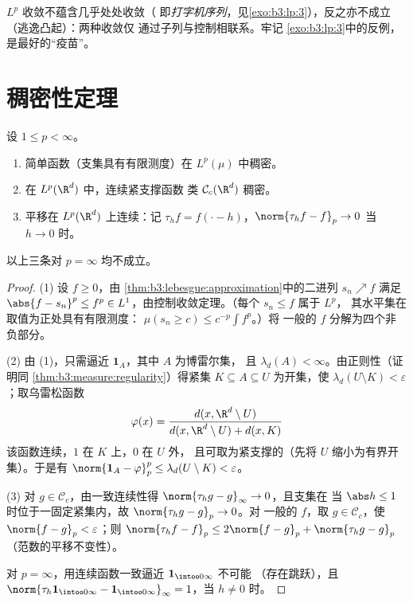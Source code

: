 \begin{remark}\label{rem:b3:lp:modes}
$L^p$ 收敛不蕴含几乎处处收敛（
即\emph{打字机序列}，见\cref{exo:b3:lp:3}），反之亦不成立
（逃逸凸起）：两种收敛仅
通过子列与控制相联系。牢记
\cref{exo:b3:lp:3}中的反例，是最好的“疫苗”。
\end{remark}

\section{稠密性定理}

\begin{theorem}\label{thm:b3:lp:density}
设 $1 \leq p < \infty$。
\begin{enumerate}
  \item 简单函数（支集具有有限测度）在
        $L^p(\mu)$ 中稠密。
  \item 在 $L^p(\R^d)$ 中，连续紧支撑函数
        类 $\mathcal C_c(\R^d)$ 稠密。
  \item 平移在 $L^p(\R^d)$ 上连续：记
        $\tau_hf = f(\cdot - h)$，$\norm{\tau_hf - f}_p \to 0$
        当 $h \to 0$ 时。
\end{enumerate}
以上三条对 $p = \infty$ 均不成立。
\end{theorem}

\begin{proof}
(1) 设 $f \geq 0$，由
\cref{thm:b3:lebesgue:approximation}中的二进列 $s_n \nearrow f$ 满足 $\abs{f - s_n}^p
\leq f^p \in L^1$，由控制收敛定理。（每个 $s_n \leq f$ 属于 $L^p$，
其水平集在取值为正处具有有限测度：
$\mu(s_n \geq c) \leq c^{-p}\int f^p$。）将
一般的 $f$ 分解为四个非负部分。

(2) 由 (1)，只需逼近 $\mathbf 1_A$，其中 $A$ 为博雷尔集，
且 $\lambda_d(A) < \infty$。由正则性（证明同
\cref{thm:b3:measure:regularity}）得紧集 $K \subseteq A
\subseteq U$ 为开集，使 $\lambda_d(U\setminus K) <
\varepsilon$；取乌雷松函数
\[
\varphi(x) = \frac{d(x, \R^d\setminus U)}{d(x, \R^d\setminus U)
+ d(x, K)}
\]
该函数连续，$1$ 在 $K$ 上，$0$ 在 $U$ 外，
且可取为紧支撑的（先将 $U$ 缩小为有界开集）。于是有
$\norm{\mathbf 1_A - \varphi}_p^p \leq \lambda_d(U\setminus K)
< \varepsilon$。

(3) 对 $g \in \mathcal C_c$，由一致连续性得
$\norm{\tau_hg - g}_\infty \to 0$，且支集在
当 $\abs h \leq 1$ 时位于一固定紧集内，故 $\norm{\tau_hg - g}_p \to 0$。对
一般的 $f$，取 $g \in \mathcal C_c$，使 $\norm{f - g}_p <
\varepsilon$；则 $\norm{\tau_hf - f}_p \leq 2\norm{f - g}_p +
\norm{\tau_hg - g}_p$（范数的平移不变性）。

对 $p = \infty$，用连续函数一致逼近 $\mathbf
1_{\intoo0\infty}$ 不可能
（存在跳跃），且 $\norm{\tau_h\mathbf 1_{\intoo0\infty} - \mathbf
1_{\intoo0\infty}}_\infty = 1$，当 $h \neq 0$ 时。
\end{proof}

